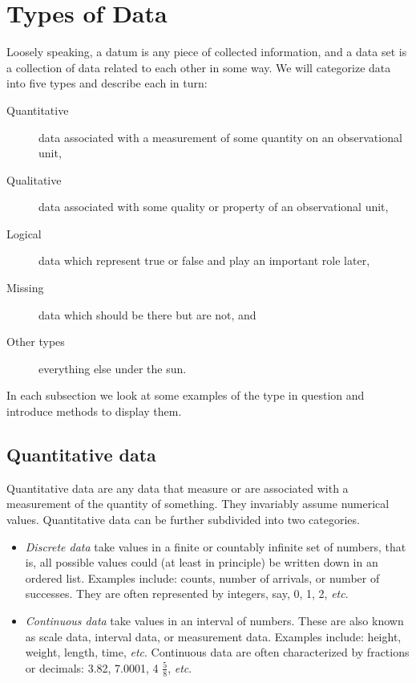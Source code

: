 \documentclass[captions=tableheading]{scrbook}
\begin{document}
\section{Types of Data}
\label{sec-3-1}

\label{sec:Types-of-Data}

Loosely speaking, a datum is any piece of collected information, and a data set is a collection of data related to each other in some way. We will categorize data into five types and describe each in turn:

\begin{description}
\item[Quantitative] data associated with a measurement of some quantity on an observational unit,
\item[Qualitative] data associated with some quality or property of an observational unit,
\item[Logical] data which represent true or false and play an important role later,
\item[Missing] data which should be there but are not, and
\item[Other types] everything else under the sun.
\end{description}

In each subsection we look at some examples of the type in question and introduce methods to display them.
\subsection{Quantitative data}
\label{sec-3-1-1}

\label{sub:Quantitative-Data}

Quantitative data are any data that measure or are associated with a measurement of the quantity of something. They invariably assume numerical values. Quantitative data can be further subdivided into two categories. 

\begin{itemize}
\item \emph{Discrete data} take values in a finite or countably infinite set of numbers, that is, all possible values could (at least in principle) be written down in an ordered list. Examples include: counts, number of arrivals, or number of successes. They are often represented by integers, say, 0, 1, 2, \emph{etc}.
\item \emph{Continuous data} take values in an interval of numbers. These are also known as scale data, interval data, or measurement data. Examples include: height, weight, length, time, \emph{etc}. Continuous data are often characterized by fractions or decimals: 3.82, 7.0001, 4 \(\frac{5}{8}\), \emph{etc}.
\end{itemize}
\end{document}
